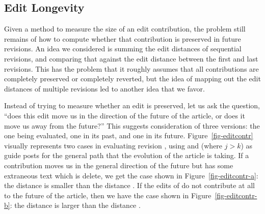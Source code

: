 \subsection{Edit Longevity}

Given a method to measure the size of an edit contribution,
the problem still remains of how to compute whether that
contribution is preserved in future revisions.
An idea we considered is summing the edit distances of
sequential revisions, and comparing that against the edit
distance between the first and last revisions.
This has the problem that it roughly assumes that all
contributions are completely preserved or completely
reverted, but the idea of mapping out the edit distances of
multiple revisions led to another idea that we favor.

Instead of trying to measure whether an edit is preserved,
let us ask the question, ``does this edit move us in the
direction of the future of the article, or does it move us away
from the future?''
This suggests consideration of three versions: the one being
evaluated, one in its past, and one in its future.
Figure~\ref{fig-editcontr} visually represents two cases in
evaluating revision , using 
and  (where $j > k$) as guide posts for the general
path that the evolution of the article is taking.
If a contribution moves us in the general direction of
the future but has some extraneous text which is delete,
we get the case shown in Figure~\ref{fig-editcontr-a}:
the distance  is smaller than the distance .
If the edits of  do not contribute at all to the
future of the article, then we have the case shown in
Figure~\ref{fig-editcontr-b}:
the distance  is larger than the distance .

